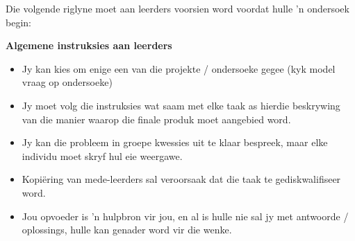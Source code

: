 Die volgende riglyne moet aan leerders voorsien word voordat hulle 'n ondersoek begin:

\textbf{Algemene instruksies aan leerders}
\begin{itemize}[noitemsep]
\item
  Jy kan kies om enige een van die projekte / ondersoeke gegee (kyk model vraag op ondersoeke)
\item
  Jy moet volg die instruksies wat saam met elke taak as hierdie beskrywing van die manier waarop die finale produk moet aangebied word.
\item
  Jy kan die probleem in groepe kwessies uit te klaar bespreek, maar elke individu moet skryf hul eie weergawe.
\item
  Kopi\"{e}ring van mede-leerders sal veroorsaak dat die taak te gediskwalifiseer word.
\item
  Jou opvoeder is 'n hulpbron vir jou, en al is hulle nie sal jy met antwoorde / oplossings, hulle kan genader word vir die wenke.\end{itemize}	

